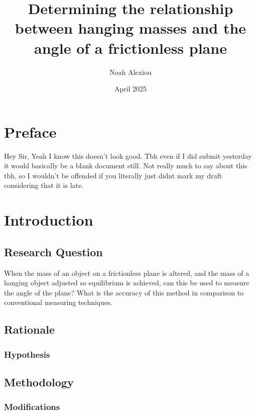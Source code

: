 \documentclass[12pt,a4paper]{article}
\begin{document}
\begin{titlepage}


\title{Determining the relationship between hanging masses and the angle of a frictionless plane}

\author{Noah Alexiou}


\date{April 2025}

\maketitle
\centering

\end{titlepage}
\tableofcontents
\newpage
\section{Preface}
Hey Sir,
Yeah I know this doesn't look good.
Tbh even if I did submit yesterday it would basically be a blank document still. 
Not really much to say about this tbh, so I wouldn't be offended if you literally just didnt mark my draft considering that it is late.
\section{Introduction}

\subsection{Research Question}
When the mass of an object on a frictionless plane is altered, and the mass of a hanging object adjusted so  equilibrium is achieved, can this be used to measure the angle of the plane? What is the accuracy of this method in comparison to conventional measuring techniques. 

\subsection{Rationale}

\subsubsection{Hypothesis}

\subsection{Methodology}

\subsubsection{Modifications}
\end{document}
